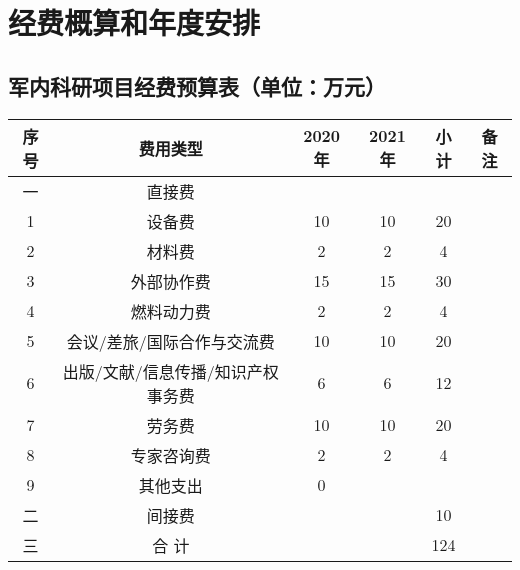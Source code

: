 


\section{经费概算和年度安排}


\subsection{军内科研项目经费预算表（单位：万元）}

\begin{table}[H]
	\centering
	\begin{tabular}{cccccc}
		\toprule
		序号 & 费用类型                          & 2020年 & 2021年 & 小计 & 备注 \\
		\midrule
		一   & 直接费                                                                          \\
		1    & 设备费                            & 10     & 10     & 20                        \\
		2    & 材料费                            & 2      & 2      & 4                         \\
		3    & 外部协作费                        & 15     & 15     & 30                        \\
		4    & 燃料动力费                        & 2      & 2      & 4                         \\
		5    & 会议/差旅/国际合作与交流费        & 10     & 10     & 20                        \\
		6    & 出版/文献/信息传播/知识产权事务费 & 6      & 6      & 12                        \\
		7    & 劳务费                            & 10     & 10     & 20                        \\
		8    & 专家咨询费                        & 2      & 2      & 4                         \\
		9    & 其他支出                          & 0                                           \\
		二   & 间接费                            &        &             & 10          \\
		三   & 合 计                             &        &             & 124         \\
		\bottomrule
	\end{tabular}
\end{table}




